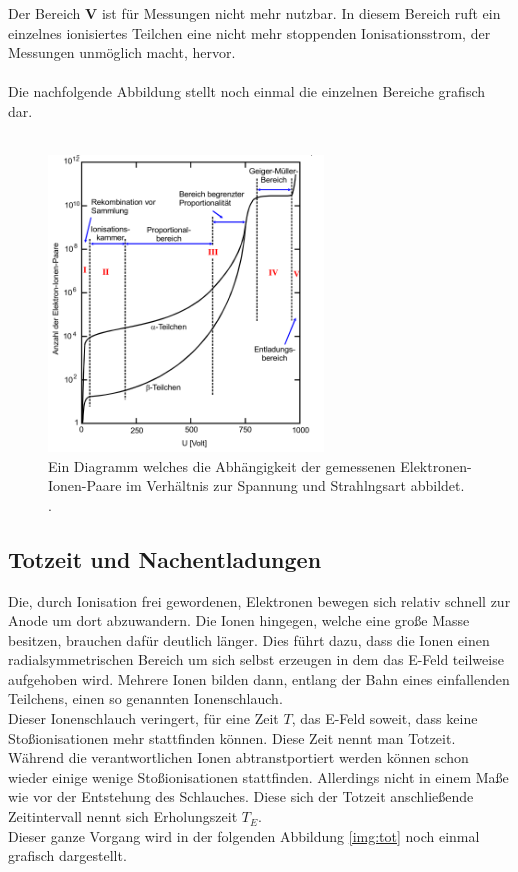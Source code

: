 Der Bereich \textbf{V} ist für Messungen nicht mehr nutzbar. In diesem Bereich ruft ein einzelnes ionisiertes Teilchen eine nicht mehr stoppenden Ionisationsstrom, der Messungen unmöglich macht, hervor.\\\\
Die nachfolgende Abbildung stellt noch einmal die einzelnen Bereiche grafisch dar.\\\\

\begin{figure}[H]
    \centering
    \includegraphics[width=0.65\textwidth]{images/Spannungsgrafik.PNG}
    \caption{Ein Diagramm welches die Abhängigkeit der gemessenen Elektronen-Ionen-Paare im Verhältnis zur Spannung und Strahlngsart abbildet. \protect \cite{V703}.}
    \label{img:spannung}
\end{figure}


\subsection{Totzeit und Nachentladungen}


\noindent
Die, durch Ionisation frei gewordenen, Elektronen bewegen sich relativ schnell zur Anode um dort abzuwandern. Die Ionen hingegen, welche eine große Masse besitzen, brauchen dafür deutlich länger.
Dies führt dazu, dass die Ionen einen radialsymmetrischen Bereich um sich selbst erzeugen in dem das E-Feld teilweise aufgehoben wird. 
Mehrere Ionen bilden dann, entlang der Bahn eines einfallenden Teilchens, einen so genannten Ionenschlauch.\\
Dieser Ionenschlauch veringert, für eine Zeit $T$, das E-Feld soweit, dass keine Stoßionisationen mehr stattfinden können. Diese Zeit nennt man Totzeit.\\
Während die verantwortlichen Ionen abtranstportiert werden können schon wieder einige wenige Stoßionisationen stattfinden. 
Allerdings nicht in einem Maße wie vor der Entstehung des Schlauches. Diese sich der Totzeit anschließende Zeitintervall nennt sich Erholungszeit $T_E$.\\
Dieser ganze Vorgang wird in der folgenden Abbildung \ref{img:tot} noch einmal grafisch dargestellt.

